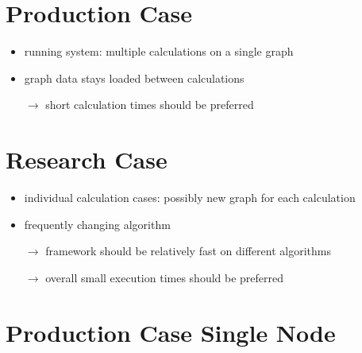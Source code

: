 \documentclass{meetings}
\begin{document}
\clearpage
\begin{multicols}{2}
\section{Production Case}
\begin{itemize}
	\item running system: multiple calculations on a single graph
	\item graph data stays loaded between calculations
	\item[$\rightarrow$] short calculation times should be preferred
\end{itemize}

\columnbreak
\section{Research Case}
\begin{itemize}
	\item individual calculation cases: possibly new graph for each calculation
	\item frequently changing algorithm
	\item[$\rightarrow$] framework should be relatively fast on different algorithms
	\item[$\rightarrow$] overall small execution times should be preferred
\end{itemize}
\end{multicols}


\section{Production Case Single Node}
\end{document}
